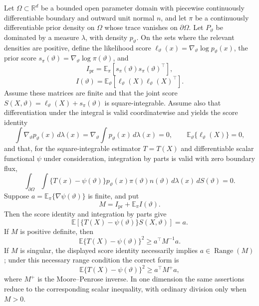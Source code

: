Let \(\Omega\subset\mathbb R^d\) be a bounded open parameter domain with piecewise continuously differentiable boundary and outward unit normal \(n\), and let \(\pi\) be a continuously differentiable prior density on \(\Omega\) whose trace vanishes on \(\partial\Omega\). Let \(P_\vartheta\) be dominated by a measure \(\lambda\), with density \(p_\vartheta\). On the sets where the relevant densities are positive, define the likelihood score \(\ell_\vartheta(x)=\nabla_\vartheta\log p_\vartheta(x)\), the prior score \(s_\pi(\vartheta)=\nabla_\vartheta\log\pi(\vartheta)\), and
\[
 I_{\mathrm{pr}}
 =\mathbb E_\pi\!\left[
 s_\pi(\vartheta)s_\pi(\vartheta)^{\!\top}
 \right],
\]
\[
 I(\vartheta)
 =\mathbb E_\vartheta\!\left[
 \ell_\vartheta(X)\ell_\vartheta(X)^{\!\top}
 \right].
\]
Assume these matrices are finite and that the joint score \(S(X,\vartheta)=\ell_\vartheta(X)+s_\pi(\vartheta)\) is square-integrable. Assume also that differentiation under the integral is valid coordinatewise and yields the score identity
\[
 \int \nabla_\vartheta p_\vartheta(x)\,d\lambda(x)
 =\nabla_\vartheta\int p_\vartheta(x)\,d\lambda(x)=0,
 \qquad
 \mathbb E_\vartheta\{\ell_\vartheta(X)\}=0,
\]
and that, for the square-integrable estimator \(T=T(X)\) and differentiable scalar functional \(\psi\) under consideration, integration by parts is valid with zero boundary flux,
\[
 \int_{\partial\Omega}\int
 \{T(x)-\psi(\vartheta)\}p_\vartheta(x)\pi(\vartheta)
 n(\vartheta)\,d\lambda(x)\,dS(\vartheta)=0.
\]
Suppose \(a=\mathbb E_\pi\{\nabla\psi(\vartheta)\}\) is finite, and put
\[
 M=I_{\mathrm{pr}}+\mathbb E_\pi I(\vartheta).
\]
Then the score identity and integration by parts give
\[
 \mathbb E\!\left[
 \{T(X)-\psi(\vartheta)\}S(X,\vartheta)
 \right]=a.
\]
If \(M\) is positive definite, then
\[
 \mathbb E\{T(X)-\psi(\vartheta)\}^{2}
 \ge a^{\!\top}M^{-1}a.
\]
If \(M\) is singular, the displayed score identity necessarily implies \(a\in\operatorname{Range}(M)\); under this necessary range condition the correct form is
\[
 \mathbb E\{T(X)-\psi(\vartheta)\}^{2}
 \ge a^{\!\top}M^{+}a,
\]
where \(M^{+}\) is the Moore--Penrose inverse. In one dimension the same assertions reduce to the corresponding scalar inequality, with ordinary division only when \(M>0\).
